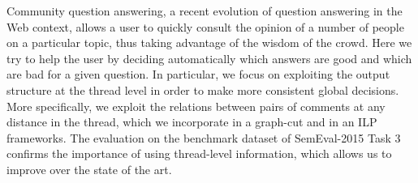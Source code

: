 Community question answering, a recent evolution of question answering in the Web context, allows a user to quickly consult the opinion of a number of people on a particular topic, thus taking advantage of the wisdom of the crowd. Here we try to help the user by deciding automatically which answers are good and which are bad for a given question. In particular, we focus on exploiting the output structure at the thread level in order to make more consistent global decisions. More specifically, we exploit the relations between pairs of comments at any distance in the thread, which we incorporate in a graph-cut and in an ILP frameworks. The evaluation on the benchmark dataset of SemEval-2015 Task 3 confirms the importance of using thread-level information, which allows us to improve over the state of the art.
